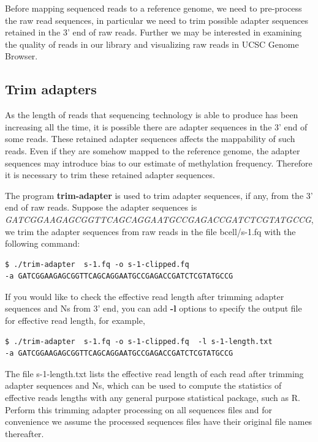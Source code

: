 \documentclass{article}
\begin{document}
Before mapping sequenced reads to a reference genome, we need to
pre-process the raw read sequences, in particular we need to trim
possible adapter sequences retained in the 3' end of raw
reads. Further we may be interested in examining the quality of reads
in our library and visualizing raw reads in UCSC Genome Browser. 

\subsection{Trim adapters}
\label{sec:trim-adapter}
As the length of reads that sequencing technology is able to produce
has been increasing all the time, it is possible there are adapter
sequences in the 3' end of some reads. These retained adapter
sequences affects the mappability of such reads. Even if they are
somehow mapped to the reference genome, the adapter sequences may
introduce bias to our estimate of methylation frequency. Therefore it
is necessary to trim these retained adapter sequences. 

The program \textbf{trim-adapter} is used to trim adapter sequences,
if any, from the 3' end of raw reads. Suppose the adapter sequences is
\textit{GATCGGAAGAGCGGTTCAGCAGGAATGCCGAGACCGATCTCGTATGCCG}, we trim
the adapter sequences from raw reads in the file bcell/s-1.fq with the
following command:
\begin{verbatim}
$ ./trim-adapter  s-1.fq -o s-1-clipped.fq  
-a GATCGGAAGAGCGGTTCAGCAGGAATGCCGAGACCGATCTCGTATGCCG  
\end{verbatim}

If you would like to check the effective read length after trimming
adapter sequences and Ns from 3' end, you can add \textbf{-l} options
to specify the output file for effective read length, for example,
\begin{verbatim}
$ ./trim-adapter  s-1.fq -o s-1-clipped.fq  -l s-1-length.txt
-a GATCGGAAGAGCGGTTCAGCAGGAATGCCGAGACCGATCTCGTATGCCG  
\end{verbatim}
The file s-1-length.txt lists the effective read length of each read
after trimming adapter sequences and Ns, which can be used to compute
the statistics of effective reads lengths with any general purpose
statistical package, such as R. Perform this trimming adapter
processing on all sequences files and for convenience we assume the
processed sequences files have their original file names thereafter.
\end{document}

